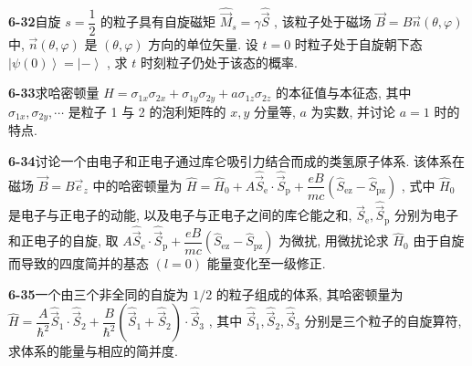 \vfill

\newpage

\textbf{6-32}\quad 自旋 $\displaystyle s = \dfrac{1}{2}$ 的粒子具有自旋磁矩 $\displaystyle \hat{\vec{M}}_s = \gamma \hat{\vec{S}}$ , 该粒子处于磁场 $\displaystyle \vec{B} = B\vec{n}(\theta, \varphi)$ 中, $\displaystyle \vec{n}(\theta, \varphi)$ 是 $\displaystyle (\theta, \varphi)$ 方向的单位矢量. 设 $\displaystyle t = 0$ 时粒子处于自旋朝下态 $\displaystyle \left|\psi(0)\right\rangle = \left| -\right\rangle$ , 求 $\displaystyle t$ 时刻粒子仍处于该态的概率.

\vfill

\newpage

\textbf{6-33}\quad 求哈密顿量 $\displaystyle \hat{H} = \sigma_{1x}\sigma_{2x} + \sigma_{1y}\sigma_{2y} + a\sigma_{1z}\sigma_{2z}$ 的本征值与本征态, 其中 $\displaystyle \sigma_{1x}, \sigma_{2y}, \cdots$ 是粒子 1 与 2 的泡利矩阵的 $\displaystyle x, y$ 分量等, $\displaystyle a$ 为实数, 并讨论 $\displaystyle a = 1$ 时的特点.

\vfill

\newpage

\textbf{6-34}\quad 讨论一个由电子和正电子通过库仑吸引力结合而成的类氢原子体系. 该体系在磁场 $\displaystyle \vec{B} = B\vec{e}_{z}$ 中的哈密顿量为 $\displaystyle \hat{H} = \hat{H}_{0} + A\hat{\vec{S}}_{\mathrm{e}} \cdot \hat{\vec{S}}_{\mathrm{p}} + \dfrac{eB}{mc}\left(\hat{S}_{\mathrm{ez}} - \hat{S}_{\mathrm{pz}}\right)$ , 式中 $\displaystyle \hat{H}_{0}$ 是电子与正电子的动能, 以及电子与正电子之间的库仑能之和, $\displaystyle \hat{\vec{S}}_{\mathrm{e}}, \hat{\vec{S}}_{\mathrm{p}}$ 分别为电子和正电子的自旋, 取 $\displaystyle A\hat{\vec{S}}_{\mathrm{e}} \cdot \hat{\vec{S}}_{\mathrm{p}} + \dfrac{eB}{mc}\left(\hat{S}_{\mathrm{ez}} - \hat{S}_{\mathrm{pz}}\right)$ 为微扰, 用微扰论求 $\displaystyle \hat{H}_{0}$ 由于自旋而导致的四度简并的基态 $\displaystyle (l = 0)$ 能量变化至一级修正.

\vfill

\newpage

\textbf{6-35}\quad 一个由三个非全同的自旋为 $\displaystyle 1/2$ 的粒子组成的体系, 其哈密顿量为 $\displaystyle \hat{H} = \dfrac{A}{\hbar^2}\hat{\vec{S}}_1 \cdot \hat{\vec{S}}_2 + \dfrac{B}{\hbar^2} (\hat{\vec{S}}_1 + \hat{\vec{S}}_2) \cdot \hat{\vec{S}}_3$ , 其中 $\displaystyle \hat{\vec{S}}_1, \hat{\vec{S}}_2, \hat{\vec{S}}_3$ 分别是三个粒子的自旋算符, 求体系的能量与相应的简并度.

\vfill

\newpage

